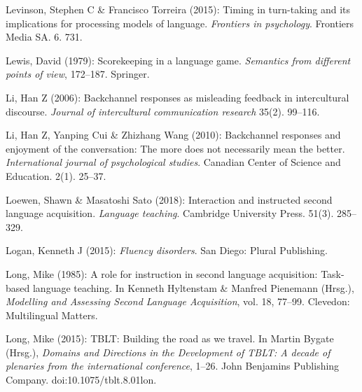 \begin{styleBibliography}
Levinson, Stephen C \& Francisco Torreira (2015): Timing in turn-taking and its implications for processing models of language. \textit{Frontiers in psychology}. Frontiers Media SA. 6. 731.
\end{styleBibliography}

\begin{styleBibliography}
Lewis, David (1979): Scorekeeping in a language game. \textit{Semantics from different points of view}, 172–187. Springer.
\end{styleBibliography}

\begin{styleBibliography}
Li, Han Z (2006): Backchannel responses as misleading feedback in intercultural discourse. \textit{Journal of intercultural communication research} 35(2). 99–116.
\end{styleBibliography}

\begin{styleBibliography}
Li, Han Z, Yanping Cui \& Zhizhang Wang (2010): Backchannel responses and enjoyment of the conversation: The more does not necessarily mean the better. \textit{International journal of psychological studies}. Canadian Center of Science and Education. 2(1). 25–37.
\end{styleBibliography}

\begin{styleBibliography}
Loewen, Shawn \& Masatoshi Sato (2018): Interaction and instructed second language acquisition. \textit{Language teaching}. Cambridge University Press. 51(3). 285–329.
\end{styleBibliography}

\begin{styleBibliography}
Logan, Kenneth J (2015): \textit{Fluency disorders}. San Diego: Plural Publishing.
\end{styleBibliography}

\begin{styleBibliography}
Long, Mike (1985): A role for instruction in second language acquisition: Task-based language teaching. In Kenneth Hyltenstam \& Manfred Pienemann (Hrsg.), \textit{Modelling and Assessing Second Language Acquisition}, vol. 18, 77–99. Clevedon: Multilingual Matters.
\end{styleBibliography}

\begin{styleBibliography}
Long, Mike (2015): TBLT: Building the road as we travel. In Martin Bygate (Hrsg.), \textit{Domains and Directions in the Development of TBLT: A decade of plenaries from the international conference}, 1–26. John Benjamins Publishing Company. doi:10.1075/tblt.8.01lon.
\end{styleBibliography}

